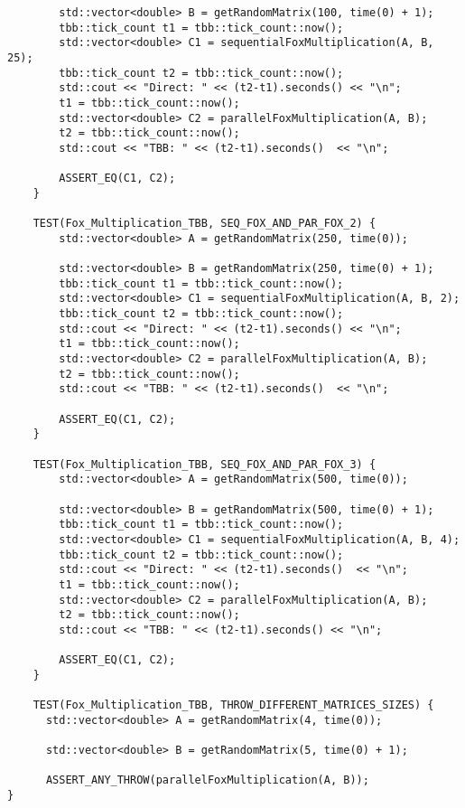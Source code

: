 \documentclass{article}
\begin{document}
\begin{lstlisting}
    	std::vector<double> B = getRandomMatrix(100, time(0) + 1);
    	tbb::tick_count t1 = tbb::tick_count::now();
    	std::vector<double> C1 = sequentialFoxMultiplication(A, B, 25);
    	tbb::tick_count t2 = tbb::tick_count::now();
    	std::cout << "Direct: " << (t2-t1).seconds() << "\n";
    	t1 = tbb::tick_count::now();
    	std::vector<double> C2 = parallelFoxMultiplication(A, B);
    	t2 = tbb::tick_count::now();
    	std::cout << "TBB: " << (t2-t1).seconds()  << "\n";

    	ASSERT_EQ(C1, C2);
	}

	TEST(Fox_Multiplication_TBB, SEQ_FOX_AND_PAR_FOX_2) {
    	std::vector<double> A = getRandomMatrix(250, time(0));

    	std::vector<double> B = getRandomMatrix(250, time(0) + 1);
    	tbb::tick_count t1 = tbb::tick_count::now();
    	std::vector<double> C1 = sequentialFoxMultiplication(A, B, 2);
    	tbb::tick_count t2 = tbb::tick_count::now();
    	std::cout << "Direct: " << (t2-t1).seconds() << "\n";
    	t1 = tbb::tick_count::now();
    	std::vector<double> C2 = parallelFoxMultiplication(A, B);
    	t2 = tbb::tick_count::now();
    	std::cout << "TBB: " << (t2-t1).seconds()  << "\n";

    	ASSERT_EQ(C1, C2);
	}

	TEST(Fox_Multiplication_TBB, SEQ_FOX_AND_PAR_FOX_3) {
    	std::vector<double> A = getRandomMatrix(500, time(0));

    	std::vector<double> B = getRandomMatrix(500, time(0) + 1);
    	tbb::tick_count t1 = tbb::tick_count::now();
    	std::vector<double> C1 = sequentialFoxMultiplication(A, B, 4);
    	tbb::tick_count t2 = tbb::tick_count::now();
    	std::cout << "Direct: " << (t2-t1).seconds()  << "\n";
    	t1 = tbb::tick_count::now();
    	std::vector<double> C2 = parallelFoxMultiplication(A, B);
    	t2 = tbb::tick_count::now();
    	std::cout << "TBB: " << (t2-t1).seconds() << "\n";

    	ASSERT_EQ(C1, C2);
	}

	TEST(Fox_Multiplication_TBB, THROW_DIFFERENT_MATRICES_SIZES) {
  	  std::vector<double> A = getRandomMatrix(4, time(0));

  	  std::vector<double> B = getRandomMatrix(5, time(0) + 1);

  	  ASSERT_ANY_THROW(parallelFoxMultiplication(A, B));
}
\end{lstlisting}
\end{document}
